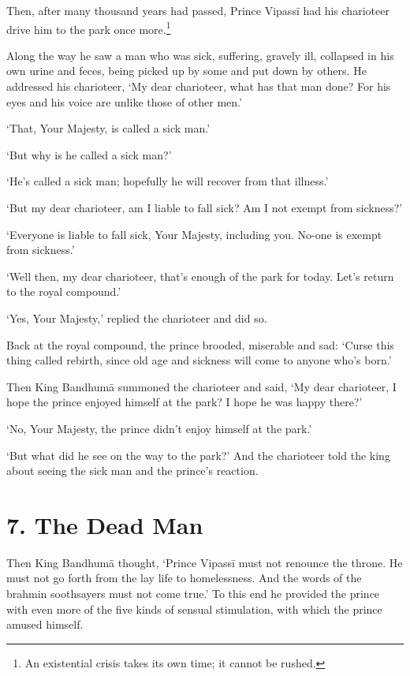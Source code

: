 \documentclass[12pt,openany]{book}%
\begin{document}
Then, after many thousand years had passed, Prince \textsanskrit{Vipassī} had his charioteer drive him to the park once more.\footnote{An existential crisis takes its own time; it cannot be rushed. } 

Along the way he saw a man who was sick, suffering, gravely ill, collapsed in his own urine and feces, being picked up by some and put down by others. He addressed his charioteer, ‘My dear charioteer, what has that man done? For his eyes and his voice are unlike those of other men.’ 

‘That, Your Majesty, is called a sick man.’ 

‘But why is he called a sick man?’ 

‘He’s called a sick man; hopefully he will recover from that illness.’ 

‘But my dear charioteer, am I liable to fall sick? Am I not exempt from sickness?’ 

‘Everyone is liable to fall sick, Your Majesty, including you. No-one is exempt from sickness.’ 

‘Well then, my dear charioteer, that’s enough of the park for today. Let’s return to the royal compound.’ 

‘Yes, Your Majesty,’ replied the charioteer and did so. 

Back at the royal compound, the prince brooded, miserable and sad: ‘Curse this thing called rebirth, since old age and sickness will come to anyone who’s born.’ 

Then King \textsanskrit{Bandhumā} summoned the charioteer and said, ‘My dear charioteer, I hope the prince enjoyed himself at the park? I hope he was happy there?’ 

‘No, Your Majesty, the prince didn’t enjoy himself at the park.’ 

‘But what did he see on the way to the park?’ And the charioteer told the king about seeing the sick man and the prince’s reaction. 

\section*{7. The Dead Man }

Then King \textsanskrit{Bandhumā} thought, ‘Prince \textsanskrit{Vipassī} must not renounce the throne. He must not go forth from the lay life to homelessness. And the words of the brahmin soothsayers must not come true.’ To this end he provided the prince with even more of the five kinds of sensual stimulation, with which the prince amused himself. 
\end{document}

